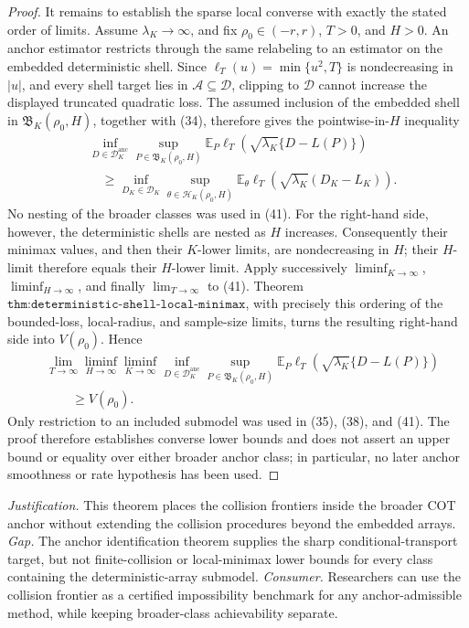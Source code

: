 \documentclass{article}
\begin{document}
\begin{proof}
It remains to establish the sparse local converse with exactly the stated
order of limits.  Assume \(\lambda_K\to\infty\), and fix
\(\rho_0\in(-r,r)\), \(T>0\), and \(H>0\).  An anchor estimator restricts
through the same relabeling to an estimator on the embedded deterministic
shell.  Since
\(\ell_T(u)=\min\{u^2,T\}\) is nondecreasing in \(|u|\), and every shell
target lies in \(\mathcal A\subseteq\mathcal D\), clipping to
\(\mathcal D\) cannot increase the displayed truncated quadratic loss.
The assumed inclusion of the embedded shell in
\(\mathfrak B_K(\rho_0,H)\), together with (34), therefore gives the
pointwise-in-\(H\) inequality
\[
\begin{aligned}
 &\inf_{D\in\mathscr D_K^{\mathrm{anc}}}
 \sup_{P\in\mathfrak B_K(\rho_0,H)}
 \mathbb E_P\ell_T\!\left(
 \sqrt{\lambda_K}\{D-L(P)\}\right)\\
 &\quad\geq
 \inf_{D_K\in\mathscr D_K}
 \sup_{\theta\in\mathcal H_K(\rho_0,H)}
 \mathbb E_\theta\ell_T\!\left(
 \sqrt{\lambda_K}(D_K-L_K)\right).
\end{aligned}
 \tag{41}
\]
No nesting of the broader classes was used in (41).  For the right-hand
side, however, the deterministic shells are nested as \(H\) increases.
Consequently their minimax values, and then their \(K\)-lower limits, are
nondecreasing in \(H\); their \(H\)-limit therefore equals their
\(H\)-lower limit.  Apply successively
\(\liminf_{K\to\infty}\), \(\liminf_{H\to\infty}\), and finally
\(\lim_{T\to\infty}\) to (41).  Theorem
\(\texttt{thm:deterministic-shell-local-minimax}\), with precisely this
ordering of the bounded-loss, local-radius, and sample-size limits, turns
the resulting right-hand side into \(V(\rho_0)\).  Hence
\[
\begin{aligned}
 &\lim_{T\to\infty}\liminf_{H\to\infty}\liminf_{K\to\infty}
 \inf_{D\in\mathscr D_K^{\mathrm{anc}}}
 \sup_{P\in\mathfrak B_K(\rho_0,H)}
 \mathbb E_P\ell_T\!\left(
 \sqrt{\lambda_K}\{D-L(P)\}\right)\\
 &\qquad\geq V(\rho_0).
\end{aligned}
 \tag{42}
\]
Only restriction to an included submodel was used in (35), (38), and
(41).  The proof therefore establishes converse lower bounds and does not
assert an upper bound or equality over either broader anchor class; in
particular, no later anchor smoothness or rate hypothesis has been used.
\end{proof}
\par\smallskip\noindent \textit{Justification.} This theorem places the collision frontiers inside the broader COT anchor without extending the collision procedures beyond the embedded arrays. \textit{Gap.} The anchor identification theorem supplies the sharp conditional-transport target, but not finite-collision or local-minimax lower bounds for every class containing the deterministic-array submodel. \textit{Consumer.} Researchers can use the collision frontier as a certified impossibility benchmark for any anchor-admissible method, while keeping broader-class achievability separate.
\end{document}
